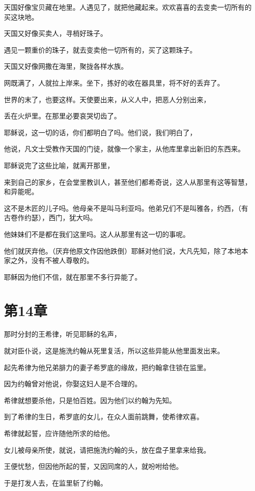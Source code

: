 \documentclass[12pt,oneside]{book}
\begin{document}
天国好像宝贝藏在地里。人遇见了，就把他藏起来。欢欢喜喜的去变卖一切所有的买这块地。

天国又好像买卖人，寻梢好珠子。

遇见一颗重价的珠子，就去变卖他一切所有的，买了这颗珠子。

天国又好像网撒在海里，聚拢各样水族。

网既满了，人就拉上岸来。坐下，拣好的收在器具里，将不好的丢弃了。

世界的末了，也要这样。天使要出来，从义人中，把恶人分别出来，

丢在火炉里。在那里必要哀哭切齿了。

耶稣说，这一切的话，你们都明白了吗。他们说，我们明白了，

他说，凡文士受教作天国的门徒，就像一个家主，从他库里拿出新旧的东西来。

耶稣说完了这些比喻，就离开那里，

来到自己的家乡，在会堂里教训人，甚至他们都希奇说，这人从那里有这等智慧，和异能呢。

这不是木匠的儿子吗。他母亲不是叫马利亚吗。他弟兄们不是叫雅各，约西，（有古卷作约瑟），西门，犹大吗。

他妹妹们不是都在我们这里吗。这人从那里有这一切的事呢。

他们就厌弃他。（厌弃他原文作因他跌倒）耶稣对他们说，大凡先知，除了本地本家之外，没有不被人尊敬的。

耶稣因为他们不信，就在那里不多行异能了。

\chapter{第14章}
那时分封的王希律，听见耶稣的名声，

就对臣仆说，这是施洗约翰从死里复活，所以这些异能从他里面发出来。

起先希律为他兄弟腓力的妻子希罗底的缘故，把约翰拿住锁在监里。

因为约翰曾对他说，你娶这妇人是不合理的。

希律就想要杀他，只是怕百姓。因为他们以约翰为先知。

到了希律的生日，希罗底的女儿，在众人面前跳舞，使希律欢喜。

希律就起誓，应许随他所求的给他。

女儿被母亲所使，就说，请把施洗约翰的头，放在盘子里拿来给我。

王便忧愁，但因他所起的誓，又因同席的人，就吩咐给他。

于是打发人去，在监里斩了约翰。
\end{document}
